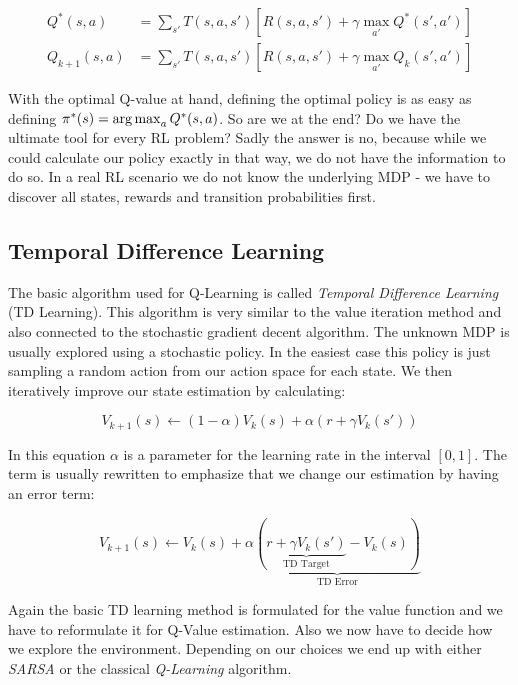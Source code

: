 \begin{align}
  Q^*(s, a) &= \sum_{s'} T(s, a, s')\left[ R(s, a, s') + \gamma \max_{a'} Q^*(s', a')\right] \label{eq:Optimal_Q_Value}\\
  Q_{k+1}(s, a) &= \sum_{s'} T(s, a, s')\left[ R(s, a, s') + \gamma \max_{a'} Q_k(s', a')\right] \label{eq:Q_Value_Iteration}
\end{align}

With the optimal Q-value at hand, defining the optimal policy is as easy as defining $\pi^*(s) = \operatorname*{arg\,max}_a Q^*(s, a)$. So are we at the end? Do we have the ultimate tool for every RL problem? Sadly the answer is no, because while we could calculate our policy exactly in that way, we do not have the information to do so. In a real RL scenario we do not know the underlying MDP - we have to discover all states, rewards and transition probabilities first. 

\subsection{Temporal Difference Learning} \label{ssec:TDLearning}
The basic algorithm used for Q-Learning is called \textit{Temporal Difference Learning} (TD Learning). This algorithm is very similar to the value iteration method and also connected to the stochastic gradient decent algorithm. The unknown MDP is usually explored using a stochastic policy. In the easiest case this policy is just sampling a random action from our action space for each state. We then iteratively improve our state estimation by calculating:

\[V_{k+1}(s) \leftarrow (1-\alpha) V_k(s) + \alpha (r + \gamma V_k(s')) \]

In this equation $\alpha$ is a parameter for the learning rate in the interval $[0, 1]$. The term is usually rewritten to emphasize that we change our estimation by having an error term:

\begin{equation*}
  V_{k+1}(s) \leftarrow V_k(s) + \alpha \underbrace{(\underbrace{r + \gamma V_k(s')}_\text{TD Target} - V_k(s))}_\text{TD Error}
\end{equation*}

Again the basic TD learning method is formulated for the value function and we have to reformulate it for Q-Value estimation. Also we now have to decide how we explore the environment. Depending on our choices we end up with either \textit{SARSA} or the classical \textit{Q-Learning} algorithm.

